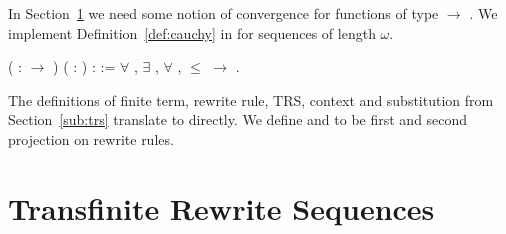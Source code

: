 In Section~\ref{sec:seq} we need some notion of convergence for functions of
type
$\rightarrow$
. We implement
Definition~\ref{def:cauchy} in \Coq for sequences of length $\omega$.
\begin{singlespace}
\begin{coqdoccode}
\coqdocnoindent
{}
( :
\ensuremath{\rightarrow} )
( : ) :
 :=\coqdoceol
\coqdocindent{1.00em}
\ensuremath{\forall} , \ensuremath{\exists} ,
\ensuremath{\forall} ,
 \ensuremath{\le} 
\ensuremath{\rightarrow}
 
.
\end{coqdoccode}
\end{singlespace}
The definitions of finite term, rewrite rule, TRS, context and substitution
from Section~\ref{sub:trs} translate to \Coq directly. We define
 and
 to be first and
second projection on rewrite rules.


\section{Transfinite Rewrite Sequences}\label{sec:seq}

